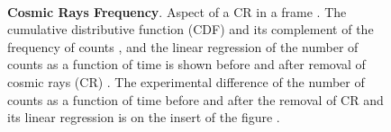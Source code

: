 



\begin{figure}[htbp]
\begin{center}
\captionsetup[subfigure]{position=top, labelfont=bf, textfont=normalfont, singlelinecheck=off, justification=raggedright }

\\

 \qquad
{}


\caption{{\bf Cosmic Rays Frequency}. Aspect of a CR in a frame . The cumulative distributive function (CDF) and its complement of the frequency of counts , and the linear regression of the number of counts as a function of time is shown before and after removal of cosmic rays (CR) .  The experimental difference of the number of counts as a function of time before and after the removal of CR and its linear regression is on the insert of the figure .  }
\label{fig:CR}
\end{center}
\end{figure}

